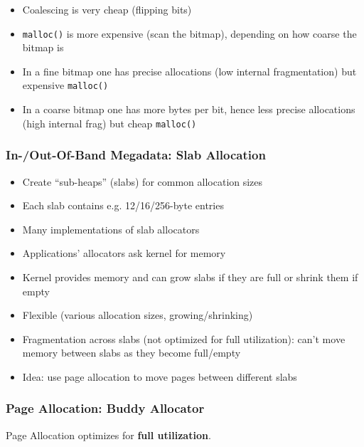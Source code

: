 
\begin{itemize}
    \item Coalescing is very cheap (flipping bits)
    \item \lstinline{malloc()} is more expensive (scan the bitmap), depending on how coarse the bitmap is
    \item In a fine bitmap one has precise allocations (low internal fragmentation) but expensive \lstinline{malloc()}
    \item In a coarse bitmap one has more bytes per bit, hence less precise allocations (high internal frag) but cheap \lstinline{malloc()}
\end{itemize}


\subsubsection{In-/Out-Of-Band Megadata: Slab Allocation}

\begin{itemize}
    \item Create ``sub-heaps'' (slabs) for common allocation sizes
    \item Each slab contains e.g. 12/16/256-byte entries
    \item Many implementations of slab allocators
    \item Applications'  allocators ask kernel for memory
    \item Kernel provides memory and can grow slabs if they are full or shrink them if empty
\end{itemize}

\begin{itemize}
    \item Flexible (various allocation sizes, growing/shrinking)
    \item Fragmentation across slabs (not optimized for full utilization): can't move memory between slabs as they become full/empty
    \item Idea: use page allocation to move pages between different slabs
\end{itemize}
\subsubsection{Page Allocation: Buddy Allocator}
Page Allocation optimizes for \textbf{full utilization}.

